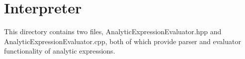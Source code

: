 %
\section{Interpreter}

This directory contains two files, AnalyticExpressionEvaluator.hpp and AnalyticExpressionEvaluator.cpp, both of which provide
parser and evaluator functionality of analytic expressions.
